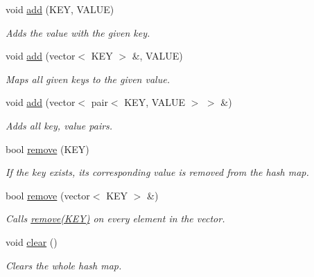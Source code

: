 {\bf }\par
\begin{DoxyCompactItemize}
\item 
void \hyperlink{class_hash_map_a6c177f77bc0b96cd6c6c1601b3e0714e}{add} (K\+E\+Y, V\+A\+L\+U\+E)
\begin{DoxyCompactList}\small\item\em Adds the value with the given key. \end{DoxyCompactList}\item 
void \hyperlink{class_hash_map_a8178f15b99b857b84ea88ebabf4fe53b}{add} (vector$<$ K\+E\+Y $>$ \&, V\+A\+L\+U\+E)
\begin{DoxyCompactList}\small\item\em Maps all given keys to the given value. \end{DoxyCompactList}\item 
void \hyperlink{class_hash_map_ac56f67e281f1bd91539035535c815121}{add} (vector$<$ pair$<$ K\+E\+Y, V\+A\+L\+U\+E $>$ $>$ \&)
\begin{DoxyCompactList}\small\item\em Adds all key, value pairs. \end{DoxyCompactList}\end{DoxyCompactItemize}

{\bf }\par
\begin{DoxyCompactItemize}
\item 
\hypertarget{class_hash_map_a0cc42915eadab1175b35cbee6cd658c1}{}bool \hyperlink{class_hash_map_a0cc42915eadab1175b35cbee6cd658c1}{remove} (K\+E\+Y)\label{class_hash_map_a0cc42915eadab1175b35cbee6cd658c1}

\begin{DoxyCompactList}\small\item\em If the key exists, its corresponding value is removed from the hash map. \end{DoxyCompactList}\item 
\hypertarget{class_hash_map_ac1997800708d2723afba29bbd4d494bf}{}bool \hyperlink{class_hash_map_ac1997800708d2723afba29bbd4d494bf}{remove} (vector$<$ K\+E\+Y $>$ \&)\label{class_hash_map_ac1997800708d2723afba29bbd4d494bf}

\begin{DoxyCompactList}\small\item\em Calls \hyperlink{class_hash_map_a0cc42915eadab1175b35cbee6cd658c1}{remove(\+K\+E\+Y)} on every element in the vector. \end{DoxyCompactList}\item 
\hypertarget{class_hash_map_aa63e547f51d713c06d7e70c0a3fc23ad}{}void \hyperlink{class_hash_map_aa63e547f51d713c06d7e70c0a3fc23ad}{clear} ()\label{class_hash_map_aa63e547f51d713c06d7e70c0a3fc23ad}

\begin{DoxyCompactList}\small\item\em Clears the whole hash map. \end{DoxyCompactList}\end{DoxyCompactItemize}

